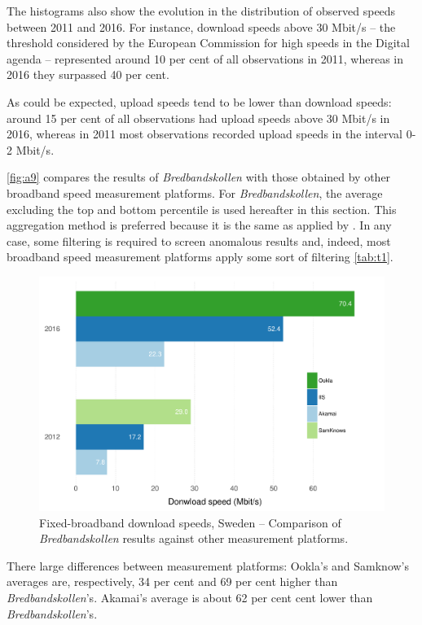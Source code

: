 \documentclass[12pt]{article}
\begin{document}
The histograms also show the evolution in the distribution of observed speeds between 2011 and 2016. For instance, download speeds above 30 Mbit/s -- the threshold considered by the European Commission for high speeds in the Digital agenda \citep{digitalagenda} -- represented around 10 per cent of all observations in 2011, whereas in 2016 they surpassed 40 per cent.

As could be expected, upload speeds tend to be lower than download speeds: around 15 per cent of all observations had upload speeds above 30 Mbit/s in 2016, whereas in 2011 most observations recorded upload speeds in the interval 0-2 Mbit/s.   

\autoref{fig:a9} compares the results of \textit{Bredbandskollen} with those obtained by other broadband speed measurement platforms. For \textit{Bredbandskollen}, the average excluding the top and bottom percentile is used hereafter in this section. This aggregation method is preferred because it is the same as applied by  \citep{samknows2013}. In any case, some filtering is required to screen anomalous results and, indeed, most broadband speed measurement platforms apply some sort of filtering \autoref{tab:t1}.       

\vspace{0.5cm} 
\begin{figure}[H]
    \centering
        \includegraphics[width=0.9\linewidth]{comparison_speeds.pdf}
        \caption{Fixed-broadband download speeds, Sweden -- Comparison of \textit{Bredbandskollen} results against other measurement platforms.}
        \label{fig:a9}
\end{figure}   

There large differences between measurement platforms: Ookla's and Samknow's averages are, respectively, 34 per cent and 69 per cent higher than \textit{Bredbandskollen}'s. Akamai's average is about 62 per cent cent lower than \textit{Bredbandskollen}'s. 
\end{document}
